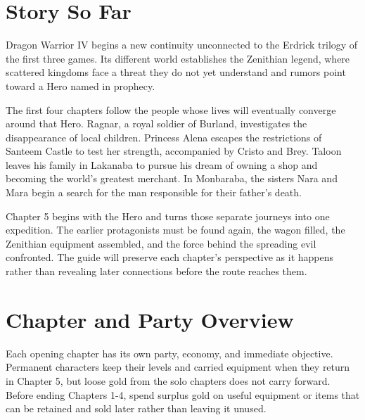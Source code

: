 \documentclass[
  american,
  10pt,
  letterpaper,
  oneside,
  open=any]{scrreprt}
\begin{document}
\section{Story So Far}\label{story-so-far}

Dragon Warrior IV begins a new continuity unconnected to the Erdrick
trilogy of the first three games. Its different world establishes the
Zenithian legend, where scattered kingdoms face a threat they do not yet
understand and rumors point toward a Hero named in prophecy.

The first four chapters follow the people whose lives will eventually
converge around that Hero. Ragnar, a royal soldier of Burland,
investigates the disappearance of local children. Princess Alena escapes
the restrictions of Santeem Castle to test her strength, accompanied by
Cristo and Brey. Taloon leaves his family in Lakanaba to pursue his
dream of owning a shop and becoming the world's greatest merchant. In
Monbaraba, the sisters Nara and Mara begin a search for the man
responsible for their father's death.

Chapter 5 begins with the Hero and turns those separate journeys into
one expedition. The earlier protagonists must be found again, the wagon
filled, the Zenithian equipment assembled, and the force behind the
spreading evil confronted. The guide will preserve each chapter's
perspective as it happens rather than revealing later connections before
the route reaches them.

\section{Chapter and Party Overview}\label{chapter-and-party-overview}

Each opening chapter has its own party, economy, and immediate
objective. Permanent characters keep their levels and carried equipment
when they return in Chapter 5, but loose gold from the solo chapters
does not carry forward. Before ending Chapters 1-4, spend surplus gold
on useful equipment or items that can be retained and sold later rather
than leaving it unused.
\end{document}
